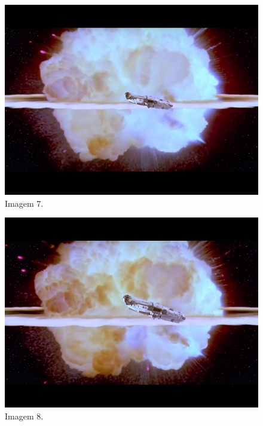 \documentclass[14pt, oneside]{book}
\theoremstyle{definition}
\begin{document}
\begin{multicols}{2}
                     \begin{figure}[H]
                        \centering
                        \includegraphics[scale=0.65]{img7.png}
                        \caption{Imagem 7.}
                        \label{manual}
                     \end{figure}
                
                    \begin{figure}[H]
                        \centering
                        \includegraphics[scale=0.65]{img8.png}
                        \caption{Imagem 8.}
                        \label{manual}
                    \end{figure}
                    

\end{multicols}
\end{document}
